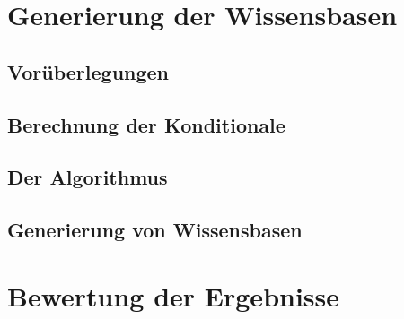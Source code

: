 \documentclass[12pt,a4paper]{article}
\begin{document}
\section{Generierung der Wissensbasen}
\subsection{Vorüberlegungen}
\subsection{Berechnung der Konditionale}
\subsection{Der Algorithmus}
\subsection{Generierung von Wissensbasen}
\section{Bewertung der Ergebnisse}

\newpage

 
\end{document}
